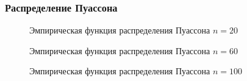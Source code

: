 \documentclass{article}
\begin{document}
\newpage
\subsubsection{Распределение Пуассона}

\begin{figure}[h]
\caption{Эмпирическая функция распределения Пуассона $n=20$}
\end{figure}

\begin{figure}[h]
\caption{Эмпирическая функция распределения Пуассона $n=60$}
\end{figure}

\begin{figure}[h]
\caption{Эмпирическая функция распределения Пуассона $n=100$}
\end{figure}
\end{document}
